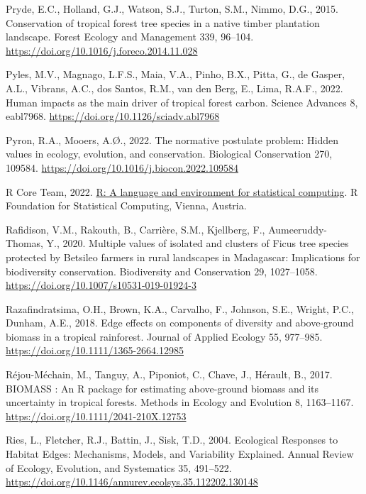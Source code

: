 \documentclass[
  12pt,
]{article}
\newlength{\cslhangindent}
\newlength{\cslentryspacingunit} %
\newenvironment{CSLReferences}[2] %
 {%
  \setlength{\parindent}{0pt}
  \ifodd #1
  \let\oldpar\par
  \def\par{\hangindent=\cslhangindent\oldpar}
  \fi
  \setlength{\parskip}{#2\cslentryspacingunit}
 }%
 {}
\begin{document}
\begin{CSLReferences}{1}{0}
\leavevmode{}%
Pryde, E.C., Holland, G.J., Watson, S.J., Turton, S.M., Nimmo, D.G., 2015. Conservation of tropical forest tree species in a native timber plantation landscape. Forest Ecology and Management 339, 96--104. \url{https://doi.org/10.1016/j.foreco.2014.11.028}

\leavevmode{}%
Pyles, M.V., Magnago, L.F.S., Maia, V.A., Pinho, B.X., Pitta, G., de Gasper, A.L., Vibrans, A.C., dos Santos, R.M., van den Berg, E., Lima, R.A.F., 2022. Human impacts as the main driver of tropical forest carbon. Science Advances 8, eabl7968. \url{https://doi.org/10.1126/sciadv.abl7968}

\leavevmode{}%
Pyron, R.A., Mooers, A.Ø., 2022. The normative postulate problem: {Hidden} values in ecology, evolution, and conservation. Biological Conservation 270, 109584. \url{https://doi.org/10.1016/j.biocon.2022.109584}

\leavevmode{}%
R Core Team, 2022. \href{https://www.R-project.org/}{R: A language and environment for statistical computing}. R Foundation for Statistical Computing, Vienna, Austria.

\leavevmode{}%
Rafidison, V.M., Rakouth, B., Carrière, S.M., Kjellberg, F., Aumeeruddy-Thomas, Y., 2020. Multiple values of isolated and clusters of {Ficus} tree species protected by {Betsileo} farmers in rural landscapes in {Madagascar}: Implications for biodiversity conservation. Biodiversity and Conservation 29, 1027--1058. \url{https://doi.org/10.1007/s10531-019-01924-3}

\leavevmode{}%
Razafindratsima, O.H., Brown, K.A., Carvalho, F., Johnson, S.E., Wright, P.C., Dunham, A.E., 2018. Edge effects on components of diversity and above-ground biomass in a tropical rainforest. Journal of Applied Ecology 55, 977--985. \url{https://doi.org/10.1111/1365-2664.12985}

\leavevmode{}%
Réjou-Méchain, M., Tanguy, A., Piponiot, C., Chave, J., Hérault, B., 2017. {BIOMASS} : An {R} package for estimating above-ground biomass and its uncertainty in tropical forests. Methods in Ecology and Evolution 8, 1163--1167. \url{https://doi.org/10.1111/2041-210X.12753}

\leavevmode{}%
Ries, L., Fletcher, R.J., Battin, J., Sisk, T.D., 2004. Ecological {Responses} to {Habitat Edges}: {Mechanisms}, {Models}, and {Variability Explained}. Annual Review of Ecology, Evolution, and Systematics 35, 491--522. \url{https://doi.org/10.1146/annurev.ecolsys.35.112202.130148}


\end{CSLReferences}
\end{document}
